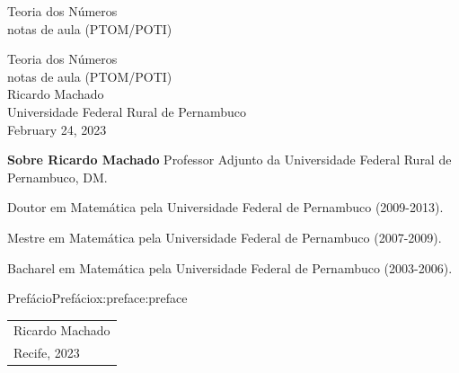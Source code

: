 \documentclass[oneside,10pt,]{book}
\newcommand{\titlepagefont}{\relax}
\numberwithin{equation}{section}
\begin{document}
\frontmatter
\thispagestyle{empty}
{\titlepagefont\centering
\vspace*{0.28\textheight}
{\Huge Teoria dos Números}\\[2\baselineskip]
{\LARGE notas de aula (PTOM\slash{}POTI)}\\
}
\clearpage
\thispagestyle{empty}
\null%
\clearpage
\thispagestyle{empty}
{\titlepagefont\centering
\vspace*{0.14\textheight}
{\Huge Teoria dos Números}\\[\baselineskip]
{\LARGE notas de aula (PTOM\slash{}POTI)}\\[3\baselineskip]
{\Large Ricardo Machado}\\[0.5\baselineskip]
{\Large Universidade Federal Rural de Pernambuco}\\[3\baselineskip]
{\Large February 24, 2023}\\}
\clearpage
\thispagestyle{empty}
\noindent\textbf{Sobre Ricardo Machado}\space\space
Professor Adjunto da Universidade Federal Rural de Pernambuco, DM.%
\par
Doutor em Matemática pela Universidade Federal de Pernambuco (2009-2013).%
\par
Mestre em Matemática pela Universidade Federal de Pernambuco (2007-2009).%
\par
Bacharel em Matemática pela Universidade Federal de Pernambuco (2003-2006).%
\par
{}
\null\clearpage
%
%
\typeout{************************************************}
\typeout{************************************************}
%
\begin{preface}{Prefácio}{}{Prefácio}{}{}{x:preface:preface}
%
\nopagebreak\par%
\hfill\begin{tabular}[t]{l@{}}
Ricardo Machado\\
Recife, 2023
\end{tabular}\\\par
\end{preface}
\end{document}
